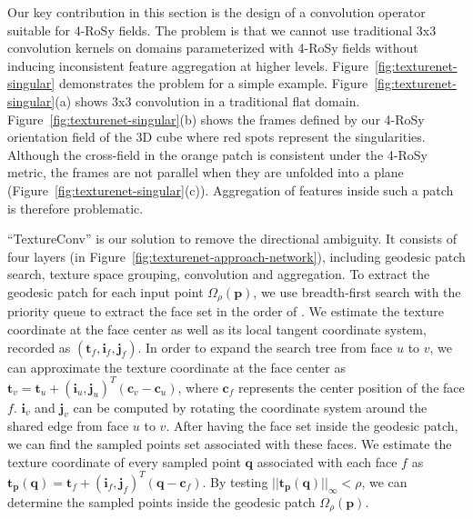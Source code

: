 Our key contribution in this section is the design of a convolution operator suitable for 4-RoSy fields. 
The problem is that we cannot use traditional 3x3 convolution kernels on domains parameterized with 4-RoSy fields without inducing inconsistent feature aggregation at higher levels.  Figure~\ref{fig:texturenet-singular} demonstrates the problem for a simple example.  Figure~\ref{fig:texturenet-singular}(a) shows 3x3 convolution in a traditional flat domain. Figure~\ref{fig:texturenet-singular}(b) shows the frames defined by our 4-RoSy orientation field of the 3D cube where red spots represent the singularities. Although the cross-field in the orange patch is consistent under the 4-RoSy metric, the frames are not parallel when they are unfolded into a plane (Figure~\ref{fig:texturenet-singular}(c)). Aggregation of features inside such a patch is therefore problematic.

``TextureConv'' is our solution to remove the directional ambiguity. It consists of four layers (in Figure~\ref{fig:texturenet-approach-network}), including geodesic patch search, texture space grouping, convolution and aggregation. To extract the geodesic patch for each input point $\Omega_\rho(\mathbf{p})$, we use breadth-first search with the priority queue to extract the face set in the order of . We estimate the texture coordinate at the face center as well as its local tangent coordinate system, recorded as $(\mathbf{t}_f,\mathbf{i}_f,\mathbf{j}_f)$. In order to expand the search tree from face $u$ to $v$, we can approximate the texture coordinate at the face center as $\mathbf{t}_{v} = \mathbf{t}_{u} + (\mathbf{i}_u,\mathbf{j}_u)^T (\mathbf{c}_v - \mathbf{c}_u)$, where $\mathbf{c}_f$ represents the center position of the face $f$. $\mathbf{i}_v$ and $\mathbf{j}_v$ can be computed by rotating the coordinate system around the shared edge from face $u$ to $v$. After having the face set inside the geodesic patch, we can find the sampled points set associated with these faces. We estimate the texture coordinate of every sampled point $\mathbf{q}$ associated with each face $f$ as $\mathbf{t}_\mathbf{p}(\mathbf{q})=\mathbf{t}_f+(\mathbf{i}_f,\mathbf{j}_f)^T(\mathbf{q} - \mathbf{c}_f)$. By testing $||\mathbf{t}_\mathbf{p}(\mathbf{q})||_\infty < \rho$, we can determine the sampled points inside the geodesic patch $\Omega_\rho(\mathbf{p})$.

